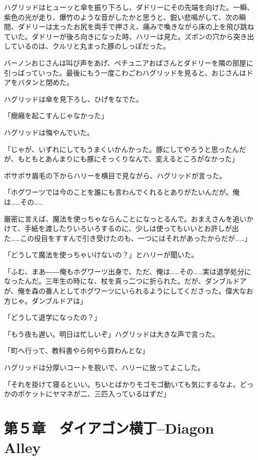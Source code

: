 \documentclass[10pt,a4paper]{article}
\begin{document}
\begin{CJK}{UTF8}{min}
ハグリッドはヒューッと傘を振り下ろし、ダドリーにその先端を向けた。一瞬、紫色の光が走り、爆竹のような音がしたかと思うと、鋭い悲鳴がして、次の瞬間、ダドリーは太ったお尻を両手で押さえ、痛みで喚きながら床の上を飛び跳ねていた。ダドリーが後ろ向きになった時、ハリーは見た。ズボンの穴から突き出しているのは、クルリと丸まった豚のしっぽだった。

バーノンおじさんは叫び声をあげ、ペチュニアおばさんとダドリーを隣の部屋に引っばっていった。最後にもう一度こわごわハグリッドを見ると、おじさんはドアをバタンと閉めた。

ハグリッドは傘を見下ろし、ひげをなでた。

「癇癪を起こすんじゃなかった」

ハグリッドは悔やんでいた。

「じゃが、いずれにしてもうまくいかんかった。豚にしてやろうと思ったんだが、もともとあんまりにも豚にそっくりなんで、変えるところがなかった」

ボサボサ眉毛の下からハリーを横目で見ながら、ハグリッドが言った。

「ホグワーツでは今のことを誰にも言わんでくれるとありがたいんだが。俺は……その……

厳密に言えば、魔法を使っちゃならんことになっとるんで。おまえさんを追いかけて、手紙を渡したりいろいろするのに、少しは使ってもいいとお許しが出た……この役目をすすんで引き受けたのも、一つにはそれがあったからだが……」

「どうして魔法を使っちゃいけないの？」とハリーが聞いた。

「ふむ、まあ――俺もホグワーツ出身で、ただ、俺は……その……実は退学処分になったんだ。三年生の時にな、杖を真っ二つに折られた。だが、ダンブルドアが、俺を森の番人としてホグワーツにいられるようにしてくださった。偉大なお方じゃ。ダンブルドアは」

「どうして退学になったの？」

「もう夜も遅い。明日は忙しいぞ」ハグリッドは大きな声で言った。

「町へ行って、教科書やら何やら買わんとな」

ハグリッドは分厚いコートを脱いで、ハリーに放ってよこした。

「それを掛けて寝るといい。ちいとばかりモゴモゴ動いても気にするなよ。どっかのボケットにヤマネが二、三匹入っているはずだ」


\section{第５章　ダイアゴン横丁--Diagon Alley}



\end{CJK}
\end{document}
